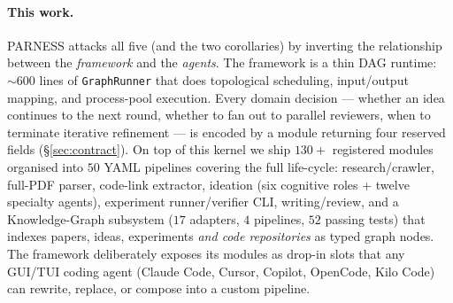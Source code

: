 \documentclass{article}
\newcommand{\parness}{\textsf{PARNESS}}
\newcommand{\code}[1]{\texttt{\small #1}}
\begin{document}
\paragraph{This work.}
\parness{} attacks all five (and the two corollaries) by inverting the
relationship between the \emph{framework} and the \emph{agents}. The
framework is a thin DAG runtime: $\sim\!600$ lines of \code{GraphRunner}
that does topological scheduling, input/output mapping, and process-pool
execution. Every domain decision --- whether an idea continues to the
next round, whether to fan out to parallel reviewers, when to terminate
iterative refinement --- is encoded by a module returning four reserved
fields (\S\ref{sec:contract}). On top of this kernel we ship $130{+}$
registered modules organised into $50$ YAML pipelines covering the full
life-cycle: research/crawler, full-PDF parser, code-link extractor,
ideation (six cognitive roles + twelve specialty agents), experiment
runner/verifier CLI, writing/review, and a Knowledge-Graph subsystem
($17$ adapters, $4$ pipelines, $52$ passing tests) that indexes papers,
ideas, experiments \emph{and code repositories} as typed graph nodes.
The framework deliberately exposes its modules as drop-in slots that any
GUI/TUI coding agent (Claude Code, Cursor, Copilot, OpenCode, Kilo Code)
can rewrite, replace, or compose into a custom pipeline.
\end{document}
